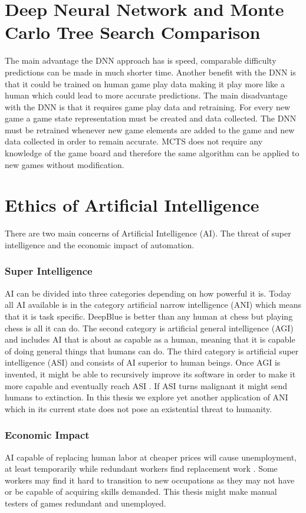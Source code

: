 \documentclass{kththesis}
\begin{document}
\section{Deep Neural Network and Monte Carlo Tree Search Comparison}
The main advantage the DNN approach has is speed, comparable difficulty predictions can be made in much shorter time. Another benefit with the DNN is that it could be trained on human game play data making it play more like a human which could lead to more accurate predictions. The main disadvantage with the DNN is that it requires game play data and retraining. For every new game a game state representation must be created and data collected. The DNN must be retrained whenever new game elements are added to the game and new data collected in order to remain accurate. MCTS does not require any knowledge of the game board and therefore the same algorithm can be applied to new games without modification.

\section{Ethics of Artificial Intelligence}
There are two main concerns of Artificial Intelligence (AI). The threat of super intelligence and the economic impact of automation.

\subsubsection{Super Intelligence}
AI can be  divided into three categories  depending on how powerful it is. Today all AI available is in the category artificial narrow intelligence (ANI) which means that it is task specific. DeepBlue is better than any human at chess but playing chess is all it can do. The second category is artificial general intelligence (AGI) and  includes AI that is about as capable as a human, meaning that it is capable of doing general things that humans can do. The third category is  artificial super intelligence (ASI) and  consists of AI superior to human beings. Once AGI is invented, it might be able to recursively improve its software in order to make it more capable and eventually reach ASI \cite{bostrom1998long}. If ASI turns malignant it might send humans to extinction. In this thesis we explore yet another application of ANI which in its current state does not pose an existential threat to humanity.

\subsubsection{Economic Impact}
AI capable of replacing human labor  at cheaper prices will cause unemployment, at least temporarily while redundant workers  find replacement work \cite{nilsson1984artificial}. Some workers may find it hard to transition to new occupations as they may not have or be capable of acquiring skills demanded. This thesis might make  manual testers of games redundant and unemployed.
\end{document}
